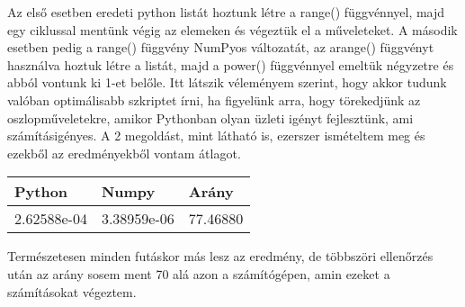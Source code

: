 \documentclass{article}
\theoremstyle{definition}
\theoremstyle{theorem}
\begin{document}
\pagebreak

Az első esetben eredeti python listát hoztunk létre a range() függvénnyel, majd egy ciklussal mentünk végig az elemeken és végeztük el a műveleteket. A második esetben pedig a range() függvény NumPyos változatát, az arange() függvényt használva hoztuk létre a listát, majd a power() függvénnyel emeltük négyzetre és abból vontunk ki 1-et belőle. Itt látszik véleményem szerint, hogy akkor tudunk valóban optimálisabb szkriptet írni, ha figyelünk arra, hogy törekedjünk az oszlopműveletekre, amikor Pythonban olyan üzleti igényt fejlesztünk, ami számításigényes.\newline
A 2 megoldást, mint látható is, ezerszer ismételtem meg és ezekből az eredményekből vontam átlagot.\newline


\begin{table}[H]
\centering
\begin{tabular}{|l|l|l|}
\hline
Python      & Numpy       & Arány    \\ \hline
2.62588e-04 & 3.38959e-06 & 77.46880 \\ \hline
\end{tabular}
\end{table}
Természetesen minden futáskor más lesz az eredmény, de többszöri ellenőrzés után az arány sosem ment 70 alá azon a számítógépen, amin ezeket a számításokat végeztem.
\end{document}
